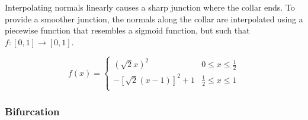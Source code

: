 \documentclass[10pt]{article}
\begin{document}
Interpolating normals linearly causes a sharp junction where the collar ends. To provide a smoother junction, the normals along the collar are interpolated using a piecewise function that resembles a sigmoid function, but such that $ f: \left[ 0, 1 \right] \rightarrow \left[ 0, 1 \right] $.

\[ f(x) =
\begin{cases}
(\sqrt{2}x)^2 & 0 \leq x \leq \frac{1}{2}\\
-\left[\sqrt{2}(x-1)\right]^2 + 1 & \frac{1}{2} \leq x \leq 1 \\
\end{cases} \]

\subsubsection{Bifurcation}
\end{document}
